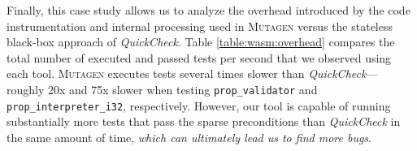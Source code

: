 \documentclass[sigconf,review,anonymous]{acmart}
\newcommand{\quickcheck}{\textit{QuickCheck}\xspace}
\newcommand{\mutagen}{\textsc{Mutagen}\xspace}
\begin{document}
Finally, this case study allows us to analyze the overhead introduced by the
code instrumentation and internal processing used in \mutagen versus the
stateless black-box approach of \quickcheck.
%
Table \ref{table:wasm:overhead} compares the total number of executed and passed
tests per second that we observed using each tool.
%
\mutagen executes tests several times slower than \quickcheck --- roughly 20x
and 75x slower when testing \texttt{prop\_validator} and
\texttt{prop\_interpreter\_i32}, respectively.
%
However, our tool is capable of running substantially more tests that pass the
sparse preconditions than \quickcheck in the same amount of time, \emph{which
  can ultimately lead us to find more bugs}.






\end{document}
